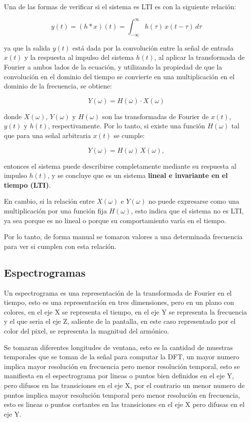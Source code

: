 \documentclass[12pt]{article}
\begin{document}
Una de las formas de verificar si el sistema es LTI es con la siguiente relación:

\[
y(t) = (h * x)(t) = \int_{-\infty}^{\infty} h(\tau)\, x(t - \tau)\, d\tau
\]

ya que la salida $y(t)$ está dada por la convolución entre la señal de entrada $x(t)$ y la respuesta al impulso del sistema $h(t)$, al aplicar la transformada de Fourier a ambos lados de la ecuación, y utilizando la propiedad de que la convolución en el dominio del tiempo se convierte en una multiplicación en el dominio de la frecuencia, se obtiene:

\[
Y(\omega) = H(\omega) \cdot X(\omega)
\]

donde $X(\omega)$, $Y(\omega)$ y $H(\omega)$ son las transformadas de Fourier de $x(t)$, $y(t)$ y $h(t)$, respectivamente. Por lo tanto, si existe una función $H(\omega)$ tal que para una señal arbitraria $x(t)$ se cumple:

\[
Y(\omega) = H(\omega)\, X(\omega),
\]

entonces el sistema puede describirse completamente mediante su respuesta al impulso $h(t)$, y se concluye que es un sistema \textbf{lineal e invariante en el tiempo (LTI)}.

En cambio, si la relación entre $X(\omega)$ e $Y(\omega)$ no puede expresarse como una multiplicación por una función fija $H(\omega)$, esto indica que el sistema no es LTI, ya sea porque es no lineal o porque su comportamiento varía en el tiempo.

Por lo tanto, de forma manual se tomaron valores a una determinada frecuencia para ver si cumplen con esta relación. 


\hypertarget{espectogramas}{%
\subsection{Espectrogramas}\label{espectogramas}}

Un espectrograma es una representación de la transformada de Fourier en el tiempo, esto es una representación en tres dimensiones, pero en un plano con colores, en el eje X se representa el tiempo, en el eje Y se representa la frecuencia y el que seria el eje Z, saliente de la pantalla, en este caso representado por el color del pixel, se representa la magnitud del armónico.

Se tomaran diferentes longitudes de ventana, esto es la cantidad de muestras temporales que se toman de la señal para computar la DFT, un mayor numero implica mayor resolución en frecuencia pero menor resolución temporal, esto se manifiesta en el espectrograma por lineas o puntos bien definidos en el eje Y, pero difusos en las transiciones en el eje X, por el contrario un menor numero de puntos implica mayor resolución temporal pero menor resolución en frecuencia, esto es lineas o puntos cortantes en las transiciones en el eje X pero difusas en el eje Y.
\end{document}
